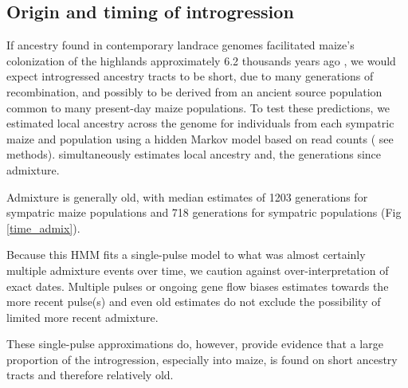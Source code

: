 \subsection*{Origin and timing of introgression}
If \mexicana ancestry found in contemporary landrace genomes facilitated maize's colonization of the highlands approximately 6.2 thousands years ago \cite{Piperno:2001_highlands}, we would expect introgressed ancestry tracts to be short, due to many generations of recombination, and possibly to be derived from an ancient source population common to many present-day maize populations.
To test these predictions, we estimated local ancestry across the genome for individuals from each sympatric maize and \mexicana population using a hidden Markov model  based on read counts (\cite{CorbettDetig:2017gh} see methods).
  simultaneously estimates local ancestry and,  the generations since admixture.

Admixture is generally old, with median estimates of 1203 generations for sympatric maize populations and 718 generations for sympatric \mexicana populations (Fig \ref{time_admix}).

Because this HMM fits a single-pulse model to what was almost certainly multiple admixture events over time, we caution against over-interpretation of exact dates.
Multiple pulses or ongoing gene flow biases estimates towards the more recent pulse(s) \cite{Moorjani:2011_rolloff, Loh:2013_alder} and even old estimates do not exclude the possibility of limited more recent admixture.

These single-pulse approximations do, however, provide evidence that a large proportion of the introgression, especially into maize, is found on short ancestry tracts and therefore relatively old. 

